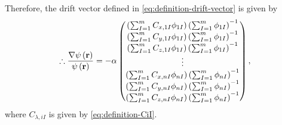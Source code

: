 Therefore, the drift vector defined in \cref{eq:definition-drift-vector} is
given by
\begin{equation} \label{eq:final-drift-vector}
    \therefore
    \frac{
        \nabla \psi \left( \boldsymbol{\mathrm{r}} \right)
    }{
        \psi \left( \boldsymbol{\mathrm{r}} \right)
    }
    =
    -\alpha
    \begin{pmatrix}
        \left( 
            \sum_{I=1}^{m} 
            C_{x,1I}
            \phi_{1I} 
        \right)
        \left( 
            \sum_{I=1}^{m} \phi_{1I}
        \right)^{-1}
        \\
        \left( 
            \sum_{I=1}^{m} 
            C_{y,1I}
            \phi_{1I} 
        \right)
        \left( 
            \sum_{I=1}^{m} \phi_{1I}
        \right)^{-1}
        \\
        \left( 
            \sum_{I=1}^{m} 
            C_{z,1I}
            \phi_{1I} 
        \right)
        \left( 
            \sum_{I=1}^{m} \phi_{1I}
        \right)^{-1}
        \\
        \vdots \\
        \left( 
            \sum_{I=1}^{m} 
            C_{x,nI}
            \phi_{nI} 
        \right)
        \left( 
            \sum_{I=1}^{m} \phi_{nI}
        \right)^{-1}
        \\
        \left( 
            \sum_{I=1}^{m} 
            C_{y,nI}
            \phi_{nI} 
        \right)
        \left( 
            \sum_{I=1}^{m} \phi_{nI}
        \right)^{-1}
        \\
        \left( 
            \sum_{I=1}^{m} 
            C_{z,nI}
            \phi_{nI} 
        \right)
        \left( 
            \sum_{I=1}^{m} \phi_{nI}
        \right)^{-1}
    \end{pmatrix}
    ,
\end{equation}
where $C_{\lambda,iI}$ is given by \cref{eq:definition-CiI}.

